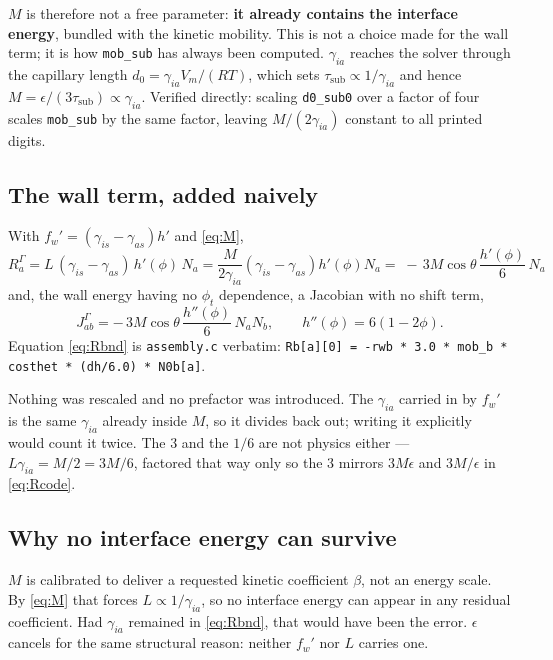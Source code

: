 \documentclass[11pt,a4paper]{article}
\newcommand{\code}[1]{\texttt{\small #1}}
\newcommand{\sia}{\gamma_{ia}}
\newcommand{\sis}{\gamma_{is}}
\newcommand{\sas}{\gamma_{as}}
\newcommand{\eps}{\epsilon}
\begin{document}
$M$ is therefore not a free parameter: \textbf{it already contains the interface
energy}, bundled with the kinetic mobility. This is not a choice made for the
wall term; it is how \code{mob\_sub} has always been computed. $\sia$ reaches the
solver through the capillary length $d_0=\sia V_m/(RT)$, which sets
$\tau_{\mathrm{sub}}\propto1/\sia$ and hence $M=\eps/(3\tau_{\mathrm{sub}})
\propto\sia$. Verified directly: scaling \code{d0\_sub0} over a factor of four
scales \code{mob\_sub} by the same factor, leaving $M/(2\sia)$ constant to all
printed digits.

\subsection{The wall term, added naively}

With $f_w'=(\sis-\sas)h'$ and \eqref{eq:M},
\begin{equation}
R^{\Gamma}_a
=L\,(\sis-\sas)\,h'(\phi)\,N_a
=\frac{M}{2\sia}(\sis-\sas)h'(\phi)N_a
=\boxed{\;-\,3M\cos\theta\,\frac{h'(\phi)}{6}\,N_a\;}
\label{eq:Rbnd}
\end{equation}
and, the wall energy having no $\phi_t$ dependence, a Jacobian with no shift term,
\begin{equation}
J^{\Gamma}_{ab}=-\,3M\cos\theta\,\frac{h''(\phi)}{6}\,N_aN_b ,
\qquad h''(\phi)=6(1-2\phi).
\end{equation}
Equation \eqref{eq:Rbnd} is \code{assembly.c} verbatim:
\code{Rb[a][0] = -rwb * 3.0 * mob\_b * costhet * (dh/6.0) * N0b[a]}.

Nothing was rescaled and no prefactor was introduced. The $\sia$ carried in by
$f_w'$ is the same $\sia$ already inside $M$, so it divides back out; writing it
explicitly would count it twice. The $3$ and the $1/6$ are not physics either ---
$L\sia=M/2=3M/6$, factored that way only so the $3$ mirrors $3M\eps$ and
$3M/\eps$ in \eqref{eq:Rcode}.

\subsection{Why no interface energy can survive}

$M$ is calibrated to deliver a requested kinetic coefficient $\beta$, not an
energy scale. By \eqref{eq:M} that forces $L\propto1/\sia$, so no interface
energy can appear in any residual coefficient. Had $\sia$ remained in
\eqref{eq:Rbnd}, that would have been the error. $\eps$ cancels for the same
structural reason: neither $f_w'$ nor $L$ carries one.
\end{document}
